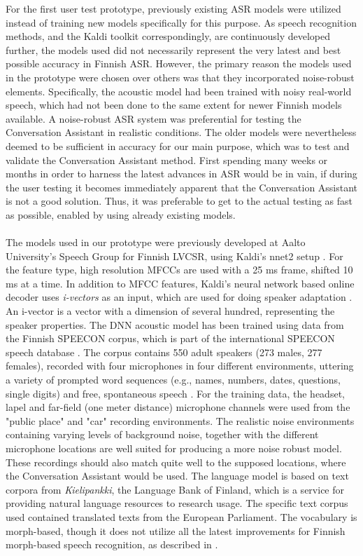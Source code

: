 \documentclass[english, 12pt, a4paper, pdftex, elec, utf8]{aaltothesis}
\begin{document}
For the first user test prototype, previously existing ASR models were utilized instead of training new models specifically for this purpose. As speech recognition methods, and the Kaldi toolkit correspondingly, are continuously developed further, the models used did not necessarily represent the very latest and best possible accuracy in Finnish ASR. However, the primary reason the models used in the prototype were chosen over others was that they incorporated noise-robust elements. Specifically, the acoustic model had been trained with noisy real-world speech, which had not been done to the same extent for newer Finnish models available. A noise-robust ASR system was preferential for testing the Conversation Assistant in realistic conditions. The older models were nevertheless deemed to be sufficient in accuracy for our main purpose, which was to test and validate the Conversation Assistant method. First spending many weeks or months in order to harness the latest advances in ASR would be in vain, if during the user testing it becomes immediately apparent that the Conversation Assistant is not a good solution. Thus, it was preferable to get to the actual testing as fast as possible, enabled by using already existing models. \\\\
The models used in our prototype were previously developed at Aalto University's Speech Group for Finnish LVCSR, using Kaldi's nnet2 setup \cite{povey2014parallel}. For the feature type, high resolution MFCCs are used with a 25 ms frame, shifted 10 ms at a time. In addition to MFCC features, Kaldi's neural network based online decoder uses \textit{i-vectors} as an input, which are used for doing speaker adaptation \cite{xiong2016achieving, kaldi}. An i-vector is a vector with a dimension of several hundred, representing the speaker properties. The DNN acoustic model has been trained using data from the Finnish SPEECON corpus, which is part of the international SPEECON speech database \cite{iskra2002speecon}. The corpus contains 550 adult speakers (273 males, 277 females), recorded with four microphones in four different environments, uttering a variety of prompted word sequences (e.g., names, numbers, dates, questions, single digits) and free, spontaneous speech \cite[p.~43]{kallasjoki2016}. For the training data, the headset, lapel and far-field (one meter distance) microphone channels were used from the "public place" and "car" recording environments. The realistic noise environments containing varying levels of background noise, together with the different microphone locations are well suited for producing a more noise robust model. These recordings should also match quite well to the supposed locations, where the Conversation Assistant would be used. The language model is based on text corpora from \textit{Kielipankki}, the Language Bank of Finland, which is a service for providing natural language resources to research usage. The specific text corpus used contained translated texts from the European Parliament. The vocabulary is morph-based, though it does not utilize all the latest improvements for Finnish morph-based speech recognition, as described in \cite{smit17boundaries, mansikka17parliament}. \\\\
\end{document}
